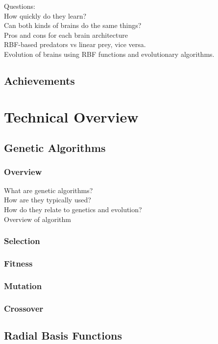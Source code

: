 \documentclass[a4paper,11pt]{kth-mag}
\begin{document}
Questions:\\
How quickly do they learn?\\
Can both kinds of brains do the same things?\\
Pros and cons for each brain architecture\\
RBF-based predators vs linear prey, vice versa.\\

Evolution of brains using RBF functions and evolutionary algorithms.

\section{Achievements}

\chapter{Technical Overview}

\section{Genetic Algorithms}

\subsection{Overview}
What are genetic algorithms?\\
How are they typically used?\\
How do they relate to genetics and evolution?\\
Overview of algorithm\\

\subsection{Selection}
\subsection{Fitness}
\subsection{Mutation}
\subsection{Crossover}

\section{Radial Basis Functions}
\end{document}
